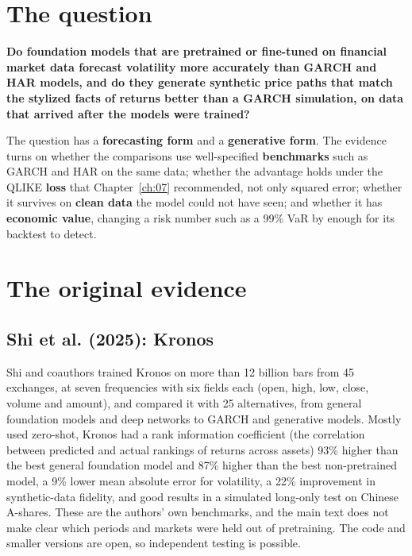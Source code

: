 \section{The question}
\label{sec:23-claim}


\begin{callout}
\textbf{Do foundation models that are pretrained or fine-tuned on financial market data forecast volatility more accurately than GARCH and HAR models, and do they generate synthetic price paths that match the stylized facts of returns better than a GARCH simulation, on data that arrived after the models were trained?}
\end{callout}

The question has a \textbf{forecasting form} and a \textbf{generative form}. The evidence turns on whether the comparisons use well-specified \textbf{benchmarks} such as GARCH and HAR on the same data; whether the advantage holds under the QLIKE \textbf{loss} that Chapter~\ref{ch:07} recommended, not only squared error; whether it survives on \textbf{clean data} the model could not have seen; and whether it has \textbf{economic value}, changing a risk number such as a 99\% VaR by enough for its backtest to detect.

\section{The original evidence}
\label{sec:23-evidence}

\subsection{Shi et al. (2025): Kronos}

Shi and coauthors trained Kronos on more than 12 billion bars from 45 exchanges, at seven frequencies with six fields each (open, high, low, close, volume and amount), and compared it with 25 alternatives, from general foundation models and deep networks to GARCH and generative models. Mostly used zero-shot, Kronos had a rank information coefficient (the correlation between predicted and actual rankings of returns across assets) 93\% higher than the best general foundation model and 87\% higher than the best non-pretrained model, a 9\% lower mean absolute error for volatility, a 22\% improvement in synthetic-data fidelity, and good results in a simulated long-only test on Chinese A-shares. These are the authors' own benchmarks, and the main text does not make clear which periods and markets were held out of pretraining. The code and smaller versions are open, so independent testing is possible.

